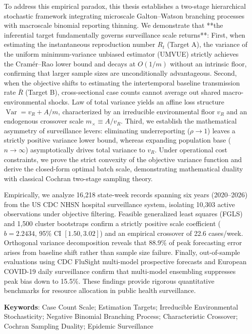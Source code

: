 \documentclass[12pt,a4paper,openany,twoside]{ctexbook}
\theoremstyle{plain}
\theoremstyle{definition}
\theoremstyle{remark}
\begin{document}
To address this empirical paradox, this thesis establishes a two-stage hierarchical stochastic framework integrating microscale Galton--Watson branching processes with macroscale binomial reporting thinning. We demonstrate that **the inferential target fundamentally governs surveillance scale returns**:
First, when estimating the instantaneous reproduction number $R_t$ (Target A), the variance of the uniform minimum-variance unbiased estimator (UMVUE) strictly achieves the Cramér--Rao lower bound and decays at $O(1/m)$ without an intrinsic floor, confirming that larger sample sizes are unconditionally advantageous.
Second, when the objective shifts to estimating the intertemporal baseline transmission rate $\bar{R}$ (Target B), cross-sectional case counts cannot average out shared macro-environmental shocks. Law of total variance yields an affine loss structure $\operatorname{Var} = v_R + A/m$, characterized by an irreducible environmental floor $v_R$ and an endogenous crossover scale $m_\times \equiv A/v_R$.
Third, we establish the mathematical asymmetry of surveillance levers: eliminating underreporting ($\rho \to 1$) leaves a strictly positive variance lower bound, whereas expanding population base ($n \to \infty$) asymptotically drives total variance to $v_R$. Under operational cost constraints, we prove the strict convexity of the objective variance function and derive the closed-form optimal batch scale, demonstrating mathematical duality with classical Cochran two-stage sampling theory.

Empirically, we analyze 16,218 state-week records spanning six years (2020--2026) from the US CDC NHSN hospital surveillance system, isolating 10,303 active observations under objective filtering. Feasible generalized least squares (FGLS) and 1,500 cluster bootstraps confirm a strictly positive scale coefficient ($\hat{b} = 2.2434$, 95\% CI $[1.50, 3.02]$) and an empirical crossover of 22.6 cases/week. Orthogonal variance decomposition reveals that 88.9\% of peak forecasting error arises from baseline shift rather than sample size failure. Finally, out-of-sample evaluations using CDC FluSight multi-model prospective forecasts and European COVID-19 daily surveillance confirm that multi-model ensembling suppresses peak bias down to 15.5\%. These findings provide rigorous quantitative benchmarks for resource allocation in public health surveillance.

\vspace{1.5ex}
\noindent\textbf{Keywords}: Case Count Scale; Estimation Targets; Irreducible Environmental Stochasticity; Negative Binomial Branching Process; Characteristic Crossover; Cochran Sampling Duality; Epidemic Surveillance
\end{document}

